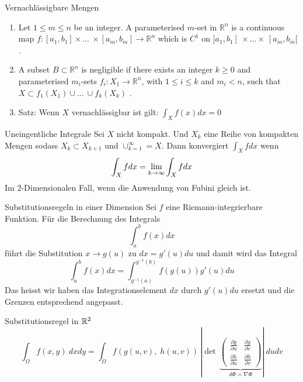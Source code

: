 \begin{Definition}{Vernachlässigbare Mengen}{}
    \begin{enumerate}
        \def\labelenumi{\arabic{enumi}.}
        \item
          Let \(1\leq m \leq n\) be an integer. A parameterised \(m\)-set in
          \(\mathbb{R}^n\) is a continuous map
          \(f:[a_1,b_1]\times ...\ \times[a_m,b_m] \rightarrow \mathbb{R}^n\)
          which is \(C^1\) on \(]a_1, b_1[\ \times ... \times\ ]a_m,b_m[\).
        \item
          A subset \(B\subset \mathbb{R}^n\) is negligible if there exists an
          integer \(k \geq 0\) and parameterised \(m_i\)-sets
          \(f_i:X_1 \rightarrow \mathbb{R}^n\), with \(1\leq i \leq k\) and
          \(m_i < n\), such that \(X\subset f_1(X_1) \cup ...\ \cup f_k(X_k)\) .
        \item Satz: Wenn $X$ vernachlässigbar ist gilt:
            $\int_X f(x) dx = 0$
    \end{enumerate}
\end{Definition}
\begin{Definition}{Uneingentliche Integrale}{}
    Sei $X$ nicht kompakt. Und $X_k$ eine Reihe von kompakten Mengen sodass $X_k \subset X_{k+1}$ und
    $\cup_{k = 1}^{\infty} = X$. Dann konvergiert $\int_X f dx$ wenn
    \[
        \int_X f dx = \lim\limits_{k \to \infty}{\int_X f dx}
    \]
    Im 2-Dimensionalen Fall, wenn die Anwendung von Fubini gleich ist.
\end{Definition}

\begin{Satz}{Substitutionsregeln in einer Dimension}{}
    Sei $f$ eine Riemann-integrierbare Funktion. Für die Berechnung des Integrals
    \[
        \int_a^b f(x) dx
    \]
    führt die Substitution $x \to g(u)$ zu $dx = g'(u)du$ und damit wird das Integral
    \[
        \int_a^b f(x) dx = \int_{g^{-1}(a)}^{g^{-1}(b)} f(g(u)) g'(u) du
    \]
    Das heisst wir haben das Integrationselement $dx$ durch $g'(u)du$ ersetzt und die Grenzen entsprechend angepasst.
\end{Satz}

\begin{Satz}{Substitutionsregel in $\mathbb{R}^2$}{}
    \[
        \int_{\Omega} f(x,y) ~ dx dy = \int_{\widetilde{\Omega}} f(g(u, v), \; h(u, v)) \, 
		    \left\lvert\det \, \underbrace{\begin{pmatrix}
			    \frac{\partial g}{\partial u} & \frac{\partial g}{\partial v}\\
			    \frac{\partial h}{\partial u} & \frac{\partial h}{\partial v}
		    \end{pmatrix}}_{d\Phi = \nabla\Phi} \right\rvert
	    ~ du dv
    \]
\end{Satz}

